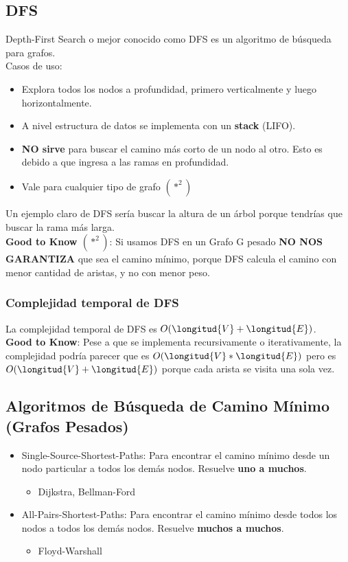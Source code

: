 \documentclass[10pt,a4paper]{article}
\begin{document}
\subsection*{DFS}
Depth-First Search o mejor conocido como DFS es un algoritmo de búsqueda para grafos. \\
Casos de uso: 
\begin{itemize}
    \item Explora todos los nodos a profundidad, primero verticalmente y luego horizontalmente.
    \item A nivel estructura de datos se implementa con un \textbf{stack} (LIFO).
    \item \textbf{NO sirve} para buscar el camino más corto de un nodo al otro. Esto es debido a que ingresa a las ramas en profundidad.
    \item Vale para cualquier tipo de grafo $(*^{2})$
\end{itemize}
Un ejemplo claro de DFS sería buscar la altura de un árbol porque tendrías que buscar la rama más larga. \\
\textbf{Good to Know $(*^{2})$}: Si usamos DFS en un Grafo G pesado \textbf{NO NOS GARANTIZA} que sea el camino mínimo, porque DFS calcula el camino con menor cantidad de aristas, y no con menor peso. 
\subsubsection*{Complejidad temporal de DFS}
La complejidad temporal de DFS es $O(\longitud{V} + \longitud{E})$. \\
\textbf{Good to Know}: Pese a que se implementa recursivamente o iterativamente, la complejidad podría parecer que es $O(\longitud{V} * \longitud{E})$ pero es $O(\longitud{V} + \longitud{E})$ porque cada arista se visita una sola vez.
\subsection*{Algoritmos de Búsqueda de Camino Mínimo (Grafos Pesados)}
\begin{itemize}
    \item Single-Source-Shortest-Paths: Para encontrar el camino mínimo desde un nodo particular a todos los demás nodos. Resuelve \textbf{uno a muchos}.
    \begin{itemize}
        \item Dijkstra, Bellman-Ford
    \end{itemize}
    \item All-Pairs-Shortest-Paths: Para encontrar el camino mínimo desde todos los nodos a todos los demás nodos. Resuelve \textbf{muchos a muchos}.
    \begin{itemize}
        \item Floyd-Warshall
    \end{itemize}
\end{itemize}
\end{document}
